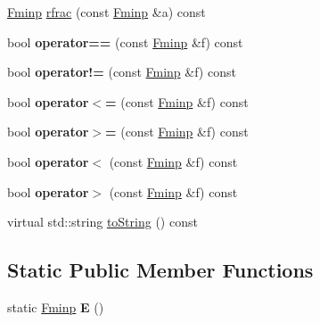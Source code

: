\begin{DoxyCompactItemize}
\item 
\mbox{\hyperlink{classetvo_i_i_1_1_fminp}{Fminp}} \mbox{\hyperlink{classetvo_i_i_1_1_fminp_acd8f776936d0d82fec1695bd7e973286}{rfrac}} (const \mbox{\hyperlink{classetvo_i_i_1_1_fminp}{Fminp}} \&a) const
\item 
\mbox{\label{classetvo_i_i_1_1_fminp_a9b374bb81954c9311da210deb81bd6a6}} 
bool {\bfseries operator==} (const \mbox{\hyperlink{classetvo_i_i_1_1_fminp}{Fminp}} \&f) const
\item 
\mbox{\label{classetvo_i_i_1_1_fminp_aa4357c6e3ffb840d50358be3e6e17368}} 
bool {\bfseries operator!=} (const \mbox{\hyperlink{classetvo_i_i_1_1_fminp}{Fminp}} \&f) const
\item 
\mbox{\label{classetvo_i_i_1_1_fminp_a7d066f56575ec2e60dd795a9a1402950}} 
bool {\bfseries operator$<$=} (const \mbox{\hyperlink{classetvo_i_i_1_1_fminp}{Fminp}} \&f) const
\item 
\mbox{\label{classetvo_i_i_1_1_fminp_a54c8f83068ed4be581d2100e0ba84dff}} 
bool {\bfseries operator$>$=} (const \mbox{\hyperlink{classetvo_i_i_1_1_fminp}{Fminp}} \&f) const
\item 
\mbox{\label{classetvo_i_i_1_1_fminp_a627dc9af353cadade39e05bef114cec4}} 
bool {\bfseries operator$<$} (const \mbox{\hyperlink{classetvo_i_i_1_1_fminp}{Fminp}} \&f) const
\item 
\mbox{\label{classetvo_i_i_1_1_fminp_aee991b830bc70ab1e199e6071559f438}} 
bool {\bfseries operator$>$} (const \mbox{\hyperlink{classetvo_i_i_1_1_fminp}{Fminp}} \&f) const
\item 
virtual std\+::string \mbox{\hyperlink{classetvo_i_i_1_1_fminp_a84497665aaf322cf0606257ca543108e}{to\+String}} () const
\end{DoxyCompactItemize}
\subsection*{Static Public Member Functions}
\begin{DoxyCompactItemize}
\item 
\mbox{\label{classetvo_i_i_1_1_fminp_ab6f7305ab07c4390288b69ef08c13151}} 
static \mbox{\hyperlink{classetvo_i_i_1_1_fminp}{Fminp}} {\bfseries E} ()
\end{DoxyCompactItemize}
